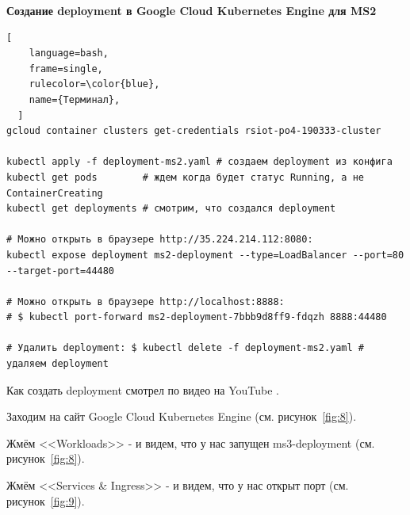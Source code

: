 \documentclass[12pt, a4paper, simple]{eskdtext}
\begin{document}
  \newpage

  \begin{center}
    \textbf{Создание deployment в Google Cloud Kubernetes Engine для MS2}
  \end{center}

  \begin{lstlisting}[
    language=bash,
    frame=single,
    rulecolor=\color{blue},
    name={Терминал},
  ]
gcloud container clusters get-credentials rsiot-po4-190333-cluster

kubectl apply -f deployment-ms2.yaml # создаем deployment из конфига
kubectl get pods        # ждем когда будет статус Running, а не ContainerCreating
kubectl get deployments # смотрим, что создался deployment

# Можно открыть в браузере http://35.224.214.112:8080:
kubectl expose deployment ms2-deployment --type=LoadBalancer --port=80 --target-port=44480

# Можно открыть в браузере http://localhost:8888:
# $ kubectl port-forward ms2-deployment-7bbb9d8ff9-fdqzh 8888:44480

# Удалить deployment: $ kubectl delete -f deployment-ms2.yaml # удаляем deployment
\end{lstlisting}

  

  Как создать deployment смотрел по видео на YouTube \cite{kubernetes_create_deployment}.

  Заходим на сайт Google Cloud Kubernetes Engine \cite{GoogleCloudConsole} (см. рисунок~\ref{fig:8}).

  Жмём <<Workloads>> - и видем, что у нас запущен ms3-deployment (см. рисунок~\ref{fig:8}).

  Жмём <<Services \& Ingress>> - и видем, что у нас открыт порт (см. рисунок~\ref{fig:9}).
\end{document}
